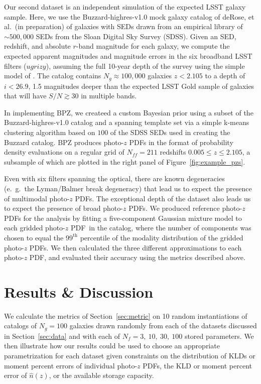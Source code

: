 \documentclass[\docopts]{\docclass}
\newcommand{\pz}{photo-$z$ PDF}
\begin{document}
Our second dataset is an independent simulation of the expected LSST galaxy 
sample.
Here, we use the Buzzard-highres-v1.0 mock galaxy catalog of deRose, et al.\ 
(in preparation) of galaxies with SEDs drawn from an empirical library of 
$\sim500,000$ SEDs from the Sloan Digital Sky Survey (SDSS).
Given an SED, redshift, and absolute $r$-band magnitude for each galaxy, we 
compute the expected apparent magnitudes and magnitude errors in the six 
broadband LSST filters ($ugrizy$), assuming the full 10-year depth of the 
survey using the simple model of \citet{ivezic_lsst:_2008}.
The catalog contains $N_{g}\approx100,000$ galaxies $z<2.105$ to a depth of 
$i<26.9$, 1.5 magnitudes deeper than the expected LSST Gold sample of galaxies 
that will have $S/N\gtrsim30$ in multiple bands.

In implementing BPZ, we createed a custom Bayesian prior using a subset of the 
Buzzard-highres-v1.0 catalog and a spanning template set via a simple k-means 
clustering algorithm based on $100$ of the SDSS SEDs used in creating the 
Buzzard catalog.
BPZ produces \pz s in the format of probability density evaluations on a 
regular grid of $N_{ff}=211$ redshifts $0.005\leq z\leq2.105$, a subsample of 
which are plotted in the right panel of Figure~\ref{fig:example_pzs}.

Even with six filters spanning the optical, there are known degeneracies 
(e.~g.~the Lyman/Balmer break degeneracy) that lead us to expect the presence 
of multimodal \pz s.
The exceptional depth of the dataset also leads us to expect the presence of 
broad \pz s.
We produced reference \pz s for the analysis by fitting a five-component 
Gaussian mixture model to each gridded \pz\ in the catalog, where the number of 
components was chosen to equal the $99^{\mathrm{th}}$ percentile of the 
modality distribution of the gridded \pz s.
We then calculated the three different approximations to each \pz, and 
evaluated their accuracy using the metrics described above.


\section{Results \& Discussion}
\label{sec:results}

We calculate the metrics of Section~\ref{sec:metric} on 10 random 
instantiations of catalogs of $N_{g}=100$ galaxies drawn randomly from each of 
the datasets discussed in Section~\ref{sec:data} and with each of $N_{f}=3,\ 
10,\ 30,\ 100$ stored parameters.
We then illustrate how our results could be used to choose an appropriate 
parametrization for each dataset given constraints on the distribution of KLDs 
or moment percent errors of individual \pz s, the KLD or moment percent error 
of $\hat{n}(z)$, or the available storage capacity.
\end{document}
